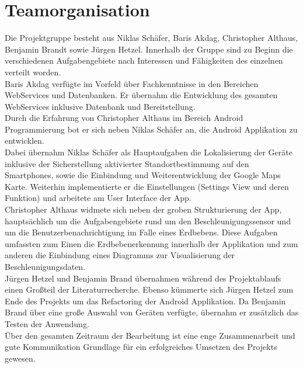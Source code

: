 \section{Teamorganisation}
Die Projektgruppe besteht aus Niklas Schäfer, Baris Akdag, Christopher Althaus, Benjamin Brandt sowie Jürgen Hetzel. Innerhalb der Gruppe sind zu Beginn die verschiedenen Aufgabengebiete nach Interessen und Fähigkeiten des einzelnen verteilt worden.\\
Baris Akdag verfügte im Vorfeld über Fachkenntnisse in den Bereichen WebServices und Datenbanken. Er übernahm die Entwicklung des gesamten WebServices inklusive Datenbank und Bereitstellung.\\
Durch die Erfahrung von Christopher Althaus im Bereich Android Programmierung bot er sich neben Niklas Schäfer an, die Android Applikation zu entwicklen.\\
Dabei übernahm Niklas Schäfer als Hauptaufgaben die Lokalisierung der Geräte inklusive der Sicherstellung aktivierter Standortbestimmung auf den Smartphones, sowie die Einbindung und Weiterentwicklung der Google Maps Karte. Weiterhin implementierte er die Einstellungen (Settings View und deren Funktion) und arbeitete am User Interface der App.\\ 
Christopher Althaus widmete sich neben der groben Strukturierung der App, hauptsächlich um die Aufgabengebiete rund um den Beschleunigungssensor und um die Benutzerbenachrichtigung im Falle eines Erdbebens. Diese Aufgaben umfassten zum Einen die Erdbebenerkennung innerhalb der Applikation und zum anderen die Einbindung eines Diagramms zur Visualisierung der Beschleunigungsdaten.\\
Jürgen Hetzel und Benjamin Brand übernahmen während des Projektablaufs einen Großteil der Literaturrecherche. Ebenso kümmerte sich Jürgen Hetzel zum Ende des Projekts um das Refactoring der Android Applikation.
Da Benjamin Brand über eine große Auswahl von Geräten verfügte, übernahm er zusätzlich das Testen der Anwendung.\\
Über den gesamten Zeitraum der Bearbeitung ist eine enge Zusammenarbeit und gute Kommunikation Grundlage für ein erfolgreiches Umsetzen des Projekts gewesen.
\newpage